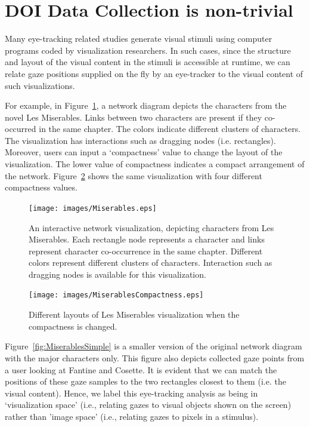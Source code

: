 \section{DOI Data Collection is non-trivial}
\label{sec:DOINonTrivial}
Many eye-tracking related studies generate visual stimuli using computer programs coded by visualization researchers. In such cases, since the structure and layout of the visual content in the stimuli is accessible at runtime, we can relate gaze positions supplied on the fly by an eye-tracker to the visual content of such visualizations.

For example, in Figure~\ref{fig:Miserables}, a network diagram depicts the characters from the novel Les Miserables. Links between two characters are present if they co-occurred in the same chapter. The colors indicate different clusters of characters. The visualization has interactions such as dragging nodes (i.e. rectangles). Moreover, users can input a `compactness' value to change the layout of the visualization. The lower value of compactness indicates a compact arrangement of the network. Figure~\ref{fig:MiserablesCompactness} shows the same visualization with four different compactness values. 


\begin{figure}[htb]
  \centering
  \texttt{[image: images/Miserables.eps]}
  \caption{An interactive network visualization, depicting characters from Les Miserables. Each rectangle node represents a character and links represent character co-occurrence in the same chapter. Different colors represent different clusters of characters. Interaction such as dragging nodes is available for this visualization.}
    \label{fig:Miserables}
\end{figure}

\begin{figure}[htb]
  \centering
  \texttt{[image: images/MiserablesCompactness.eps]}
  \caption{Different layouts of Les Miserables visualization when the compactness is changed.}
    \label{fig:MiserablesCompactness}
\end{figure}

Figure~\ref{fig:MiserablesSimple} is a smaller version of the original network diagram with the major characters only. This figure also depicts collected gaze points from a user looking at Fantine and Cosette. It is evident that we can match the positions of these gaze samples to the two rectangles closest to them (i.e. the visual content). Hence, we label this eye-tracking analysis as being in `visualization space' (i.e., relating gazes to visual objects shown on the screen) rather than 'image space' (i.e., relating gazes to pixels in a stimulus).

